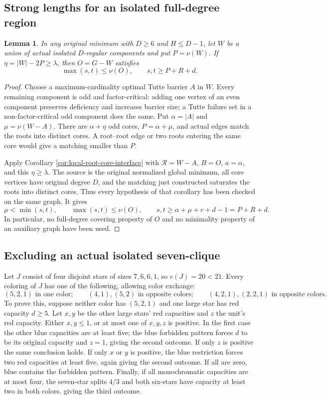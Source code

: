 \documentclass[11pt,a4paper]{article}
\newtheorem{lemma}[theorem]{Lemma}
\theoremstyle{definition}
\begin{document}
\subsection{Strong lengths for an isolated full-degree region}
\begin{lemma}\label{lem:isolated-length}
In any original minimum with $D\ge6$ and $H\le D-1$, let $W$ be a union of actual isolated $D$-regular components and put $P=\nu(W)$. If $\eta=|W|-2P\ge\lambda$, then $O=G-W$ satisfies
\[
 \max(s,t)\le\nu(O),\qquad s,t\ge P+R+d.
\]
\end{lemma}
\begin{proof}
Choose a maximum-cardinality optimal Tutte barrier $A$ in $W$. Every remaining component is odd and factor-critical: adding one vertex of an even component preserves deficiency and increases barrier size; a Tutte failure set in a non-factor-critical odd component does the same. Put $\alpha=|A|$ and $\mu=\nu(W-A)$. There are $\alpha+\eta$ odd cores, $P=\alpha+\mu$, and actual edges match the roots into distinct cores. A root--root edge or two roots entering the same core would give a matching smaller than $P$.

Apply Corollary \ref{cor:local-root-core-interface} with
$\mathcal R=W-A$, $B=O$, $a=\alpha$, and this $\eta\ge\lambda$.
The source is the original normalized global minimum, all core vertices
have original degree $D$, and the matching just constructed saturates
the roots into distinct cores. Thus every hypothesis of that corollary
has been checked on the same graph. It gives
\[
 \mu<\min(s,t),\qquad \max(s,t)\le\nu(O),\qquad
 s,t\ge\alpha+\mu+r+d-1=P+R+d.
\]
In particular, no full-degree covering property of $O$ and no minimality
property of an auxiliary graph have been used.
\end{proof}

\subsection{Excluding an actual isolated seven-clique}
Let $J$ consist of four disjoint stars of sizes $7,6,6,1$, so $e(J)=20<21$. Every coloring of $J$ has one of the following, allowing color exchange:
\[
 (5,2,1)\text{ in one color};\qquad
 (4,1),(5,2)\text{ in opposite colors};\qquad
 (4,2,1),(2,2,1)\text{ in opposite colors}.
\]
To prove this, suppose neither color has $(5,2,1)$ and one large star has red capacity $d\ge5$. Let $x,y$ be the other large stars' red capacities and $z$ the unit's red capacity. Either $x,y\le1$, or at most one of $x,y,z$ is positive. In the first case the other blue capacities are at least five; the blue forbidden pattern forces $d$ to be its original capacity and $z=1$, giving the second outcome. If only $z$ is positive the same conclusion holds. If only $x$ or $y$ is positive, the blue restriction forces two red capacities at least five, again giving the second outcome. If all are zero, blue contains the forbidden pattern. Finally, if all monochromatic capacities are at most four, the seven-star splits $4/3$ and both six-stars have capacity at least two in both colors, giving the third outcome.
\end{document}
